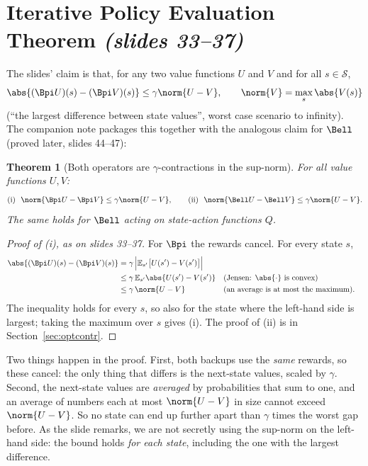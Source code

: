 \documentclass[11pt,a4paper]{article}
\newcommand{\E}{\mathbb{E}}
\newcommand{\slides}[1]{\emph{(slides #1)}}
\newcommand{\cS}{\mathcal{S}}
\theoremstyle{plain}
\newtheorem{theorem}{Theorem}[section]
\theoremstyle{definition}
\theoremstyle{remark}
\begin{document}
\section{Iterative Policy Evaluation Theorem \slides{33--37}}\label{sec:thm4}
The slides' claim is that, for any two value functions $U$ and $V$ and for all $s\in\cS$,
\[
\abs{(\Bpi U)(s)-(\Bpi V)(s)}\le\gamma\norm{U-V},\qquad\norm{V}=\max_s\abs{V(s)}
\]
(``the largest difference between state values'', worst case scenario to infinity). The companion note packages this together with the analogous claim for $\Bell$ (proved later, slides 44--47):

\begin{theorem}[Both operators are $\gamma$-contractions in the sup-norm]\label{thm:contraction}
For all value functions $U,V$:
\[
\text{(i)}\ \ \norm{\Bpi U-\Bpi V}\le\gamma\norm{U-V},\qquad
\text{(ii)}\ \ \norm{\Bell U-\Bell V}\le\gamma\norm{U-V}.
\]
The same holds for $\Bell$ acting on state-action functions $Q$.
\end{theorem}
\begin{proof}[Proof of (i), as on slides 33--37]
For $\Bpi$ the rewards cancel. For every state $s$,
\begin{align*}
\abs{(\Bpi U)(s)-(\Bpi V)(s)}
&=\gamma\,\Big|\E_{s'}\big[U(s')-V(s')\big]\Big|\\
&\le\gamma\,\E_{s'}\abs{U(s')-V(s')} &&\text{(Jensen: $\abs{\cdot}$ is convex)}\\
&\le\gamma\,\norm{U-V} &&\text{(an average is at most the maximum).}
\end{align*}
The inequality holds for every $s$, so also for the state where the left-hand side is largest; taking the maximum over $s$ gives (i). The proof of (ii) is in Section~\ref{sec:optcontr}.
\end{proof}

\begin{intuition}
Two things happen in the proof. First, both backups use the \emph{same} rewards, so these cancel: the only thing that differs is the next-state values, scaled by $\gamma$. Second, the next-state values are \emph{averaged} by probabilities that sum to one, and an average of numbers each at most $\norm{U-V}$ in size cannot exceed $\norm{U-V}$. So no state can end up further apart than $\gamma$ times the worst gap before. As the slide remarks, we are not secretly using the sup-norm on the left-hand side: the bound holds \emph{for each state}, including the one with the largest difference.
\end{intuition}
\end{document}
